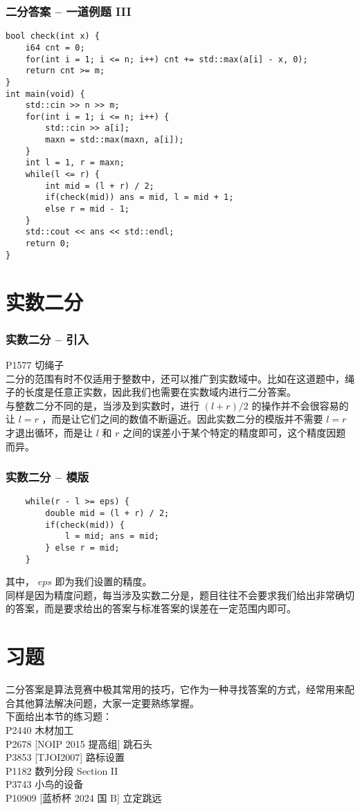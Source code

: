 \documentclass{beamer}
\begin{document}
\begin{frame}[fragile]
\frametitle{二分答案 -- 一道例题 III}
\begin{onlyenv}
\begin{verbatim}
bool check(int x) {
    i64 cnt = 0;
    for(int i = 1; i <= n; i++) cnt += std::max(a[i] - x, 0);
    return cnt >= m;
}
int main(void) {
    std::cin >> n >> m;
    for(int i = 1; i <= n; i++) {
        std::cin >> a[i];
        maxn = std::max(maxn, a[i]);
    }
    int l = 1, r = maxn;
    while(l <= r) {
        int mid = (l + r) / 2;
        if(check(mid)) ans = mid, l = mid + 1;
        else r = mid - 1;
    }
    std::cout << ans << std::endl;
    return 0;
}
\end{verbatim}
\end{onlyenv}
\end{frame}
\section{实数二分}
\begin{frame}
\frametitle{实数二分 -- 引入}
P1577 切绳子\\ 
二分的范围有时不仅适用于整数中，还可以推广到实数域中。比如在这道题中，绳子的长度是任意正实数，因此我们也需要在实数域内进行二分答案。\\ 
与整数二分不同的是，当涉及到实数时，进行 $(l + r) / 2$ 的操作并不会很容易的让 $l = r$ ，而是让它们之间的数值不断逼近。因此实数二分的模版并不需要 $l = r$ 才退出循环，而是让 $l$ 和 $r$ 之间的误差小于某个特定的精度即可，这个精度因题而异。
\end{frame}
\begin{frame}[fragile]
\frametitle{实数二分 -- 模版}
\begin{onlyenv}
\begin{verbatim}
    while(r - l >= eps) {
        double mid = (l + r) / 2;
        if(check(mid)) {
            l = mid; ans = mid;
        } else r = mid;
    }
\end{verbatim}
\end{onlyenv}
其中， $eps$ 即为我们设置的精度。\\ 
同样是因为精度问题，每当涉及实数二分是，题目往往不会要求我们给出非常确切的答案，而是要求给出的答案与标准答案的误差在一定范围内即可。
\end{frame}
\section{习题}
\begin{frame}
二分答案是算法竞赛中极其常用的技巧，它作为一种寻找答案的方式，经常用来配合其他算法解决问题，大家一定要熟练掌握。\\ 
下面给出本节的练习题：\\ 
P2440	木材加工 	\\
P2678	[NOIP 2015 提高组] 跳石头 \\
P3853	[TJOI2007] 路标设置 \\
P1182	数列分段 Section II \\
P3743	小鸟的设备 \\
P10909 [蓝桥杯 2024 国 B] 立定跳远 \\
\end{frame}
\end{document}
